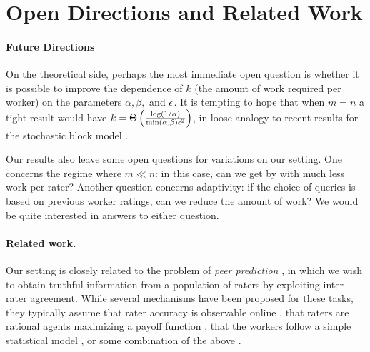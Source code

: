 \section{Open Directions and Related Work}
\label{sec:discussion}
\iffalse
\todo{fill in with lower bounds and conjectures that explain what 
``best possible'' result would look like, and how adversarial and 
stochastic settings compare}\fi

\paragraph{Future Directions}
On the theoretical side, perhaps the most immediate open question is whether it is 
possible to improve the dependence of $k$ (the amount of work required per worker) 
on the parameters $\alpha, \beta,$ and $\epsilon$.  It is tempting to hope that 
when $m = n$ a tight result would have 
$k = \Theta\left( \frac{\log(1/\alpha)}{\min (\alpha,\beta)\epsilon^2} \right)$, in loose analogy
to recent results for the stochastic block model .

Our results also leave some open questions for variations on our setting. 
One concerns the regime where $m \ll n$: in this case, can we get by 
with much less work per rater?
Another question concerns adaptivity: if the choice of queries is based 
on previous worker ratings, can we reduce the amount of work?
We would be quite interested in answers to either question.


\paragraph{Related work.}
Our setting is closely related to the problem of \emph{peer prediction} 
, in which we wish to obtain truthful information 
from a population of raters by exploiting inter-rater agreement. 
While several mechanisms have been proposed for these tasks, 
they typically assume that rater accuracy is observable online
, that raters are 
rational agents maximizing a payoff function , that the workers follow a simple 
statistical model , or some combination of the above . 

